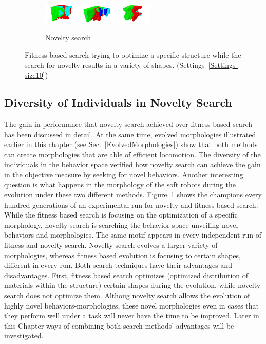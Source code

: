 \begin{figure}[t!]
\begin{subfigure}[b]{1.0\textwidth}
\includegraphics[width=0.19\textwidth]{../Figures/Robots/n_4_g_800.jpg}
\includegraphics[width=0.19\textwidth]{../Figures/Robots/n_4_g_900.jpg}
\includegraphics[width=0.19\textwidth]{../Figures/Robots/n_4_g_1000.jpg}
\caption{Novelty search}
\end{subfigure}
\caption{Fitness based search trying to optimize a specific structure while the search for novelty results in a variety of shapes. (Settings~\ref{Settings-size10})}
\label{fig:morphologies}
\end{figure}


\subsection{Diversity of Individuals in Novelty Search}

The gain in performance that novelty search achieved over fitness based search has been discussed in detail.  At the same time, evolved morphologies illustrated earlier in this chapter (see Sec.~\ref{EvolvedMorphologies}) show that both methods can create morphologies that are able of efficient locomotion. The diversity of the individuals in the behavior space verified how novelty search can achieve the gain in the objective measure by seeking for novel behaviors. Another interesting question is what happens in the morphology of the soft robots during the evolution under these two different methods. Figure~\ref{fig:morphologies} shows the champions every hundred generations of an experimental run for novelty and fitness based search. While the fitness based search is focusing on the optimization of a specific morphology, novelty search is searching the behavior space unveiling novel behaviors and morphologies. The same motif appears in every independent run of fitness and novelty search. Novelty search evolves a larger variety of morphologies, whereas fitness based evolution is focusing to certain shapes, different in every run. Both search techniques have their advantages and disadvantages. First, fitness based search optimizes (optimized distribution of materials within the structure) certain shapes during the evolution, while novelty search does not optimize them. Althoug novelty search allows the evolution of highly novel behaviors-morphologies, these novel morphologies even in cases that they perform well under a task will never have the time to be improved. Later in this Chapter ways of combining both search methods' advantages will be investigated.

